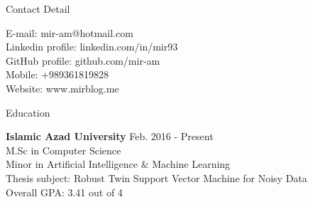 \documentclass{resume} %
\begin{document}


\begin{rSection}{Contact Detail}

\begin{multicols}{2}
E-mail: mir-am@hotmail.com \\
Linkedin profile: linkedin.com/in/mir93 \\
GitHub profile: github.com/mir-am \\
\vfill\null
\columnbreak
Mobile: +989361819828\\
Website: www.mirblog.me\\

\end{multicols}

	
	

	



	
\end{rSection}


\begin{rSection}{Education}

{\bf Islamic Azad University} \hfill {Feb. 2016 - Present} \\ 
M.Sc in Computer Science  \\
Minor in Artificial Intelligence \& Machine Learning  \smallskip \\
Thesis subject: Robust Twin Support Vector Machine for Noisy Data \\
Overall GPA: 3.41 out of 4

\end{rSection}
\end{document}
